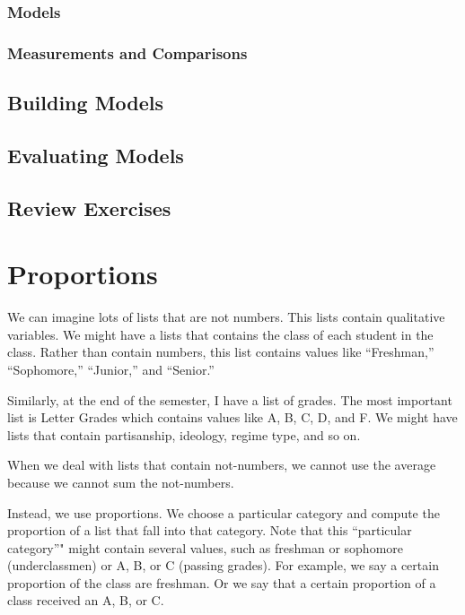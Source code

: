 \documentclass[]{book}
\theoremstyle{definition}
\theoremstyle{definition}
\theoremstyle{definition}
\theoremstyle{remark}
\begin{document}
\subsection{Models}\label{models-1}

\subsection{Measurements and
Comparisons}\label{measurements-and-comparisons}

\section{Building Models}\label{building-models}

\section{Evaluating Models}\label{evaluating-models}

\section{Review Exercises}\label{review-exercises}

\chapter{Proportions}\label{proportions}

We can imagine lots of lists that are not numbers. This lists contain
qualitative variables. We might have a lists that contains the class of
each student in the class. Rather than contain numbers, this list
contains values like ``Freshman,'' ``Sophomore,'' ``Junior,'' and
``Senior.''

Similarly, at the end of the semester, I have a list of grades. The most
important list is Letter Grades which contains values like A, B, C, D,
and F. We might have lists that contain partisanship, ideology, regime
type, and so on.

When we deal with lists that contain not-numbers, we cannot use the
average because we cannot sum the not-numbers.

Instead, we use proportions. We choose a particular category and compute
the proportion of a list that fall into that category. Note that this
``particular category''" might contain several values, such as freshman
or sophomore (underclassmen) or A, B, or C (passing grades). For
example, we say a certain proportion of the class are freshman. Or we
say that a certain proportion of a class received an A, B, or C.
\end{document}
